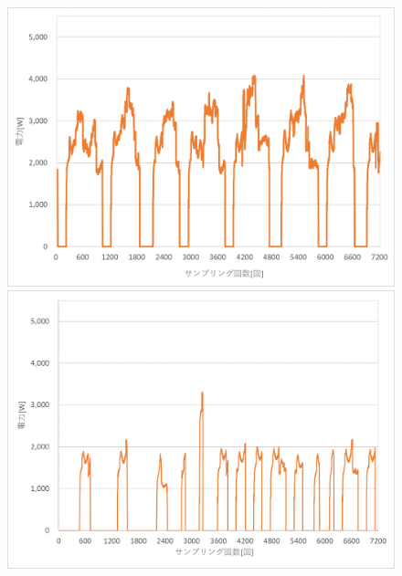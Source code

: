 \documentclass[a4j,fleqn,dvipdfmx,uplatex]{jsarticle}
\begin{document}
\begin{figure}[htb]
  \centering
    \begin{minipage}[b]{0.46\linewidth}
      \centering
      \includegraphics[width=\linewidth]{img/0713_power.png}
    \end{minipage}
    \begin{minipage}[b]{0.46\linewidth}
      \centering
      \includegraphics[width=\linewidth]{img/0715_power.png}
    \end{minipage}\\
    \begin{minipage}[b]{0.46\linewidth}
      \centering

\end{minipage}
\end{figure}
\end{document}
